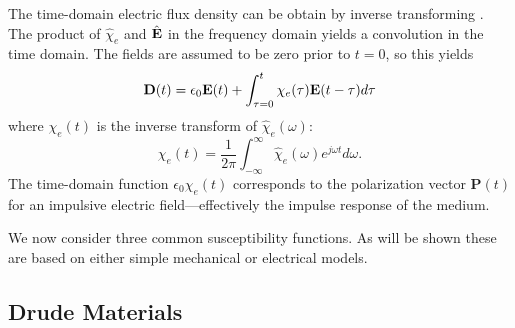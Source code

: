 The time-domain electric flux density can be obtain by inverse
transforming .  The product of
$\hat{\chi}_e$ and $\hat{\mathbf{E}}$ in the frequency domain yields a
convolution in the time domain.  The fields are assumed to be zero
prior to $t=0$, so this yields
\begin{equation}
  \mathbf{D}(t) = \epsilon_0\mathbf{E}(t) + \int_{\tau=0}^t
	  \chi_e(\tau)\mathbf{E}(t-\tau)d\tau
\end{equation}
where $\chi_e(t)$ is the inverse transform of $\hat{\chi}_e(\omega)$:
\begin{equation}
  \chi_e(t) =
  \frac{1}{2\pi}\int_{-\infty}^\infty \hat{\chi}_e(\omega) e^{j\omega t} d\omega.
\end{equation}
The time-domain function $\epsilon_0\chi_e(t)$ corresponds to the
polarization vector $\mathbf{P}(t)$ for an impulsive electric
field---effectively the impulse response of the medium.

We now consider three common susceptibility functions.  As will be
shown these are based on either simple mechanical or electrical
models.

\subsection{Drude Materials}

